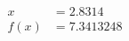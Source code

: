 \documentclass[preview]{standalone}
\begin{document}
\begin{align*}
x &= 2.8314\\f(x) &= 7.3413248
\end{align*}
\end{document}
